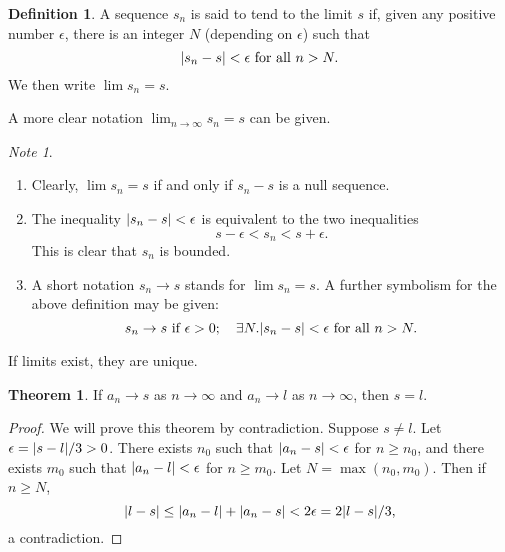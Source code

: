 \documentclass[12pt]{book}
\newcommand{\ra}{\rightarrow}
\theoremstyle{definition}
\newtheorem{definition}{Definition}[section]
\newtheorem{theorem}{Theorem}[chapter]
\theoremstyle{remark}
\newtheorem*{note}{Note}
\DeclarePairedDelimiter\abs{\lvert}{\rvert}
\begin{document}
				\begin{definition}
					A sequence $s_n$ is said to tend to the limit $s$ if, given any positive number $\epsilon$, there is an integer $N$ (depending on $\epsilon$) such that
						\begin{equation*}
							\abs*{s_n - s} < \epsilon \text{ for all } n > N.
						\end{equation*}
						We then write $\lim s_n = s$.
				\end{definition}
			  A more clear notation $\lim_{n \ra \infty} s_n = s$ can be given.
			\begin{note}
				\begin{enumerate}
					\item Clearly, $\lim s_n = s$ if and only if $s_n - s$ is a null sequence.
					
					\item The inequality $\abs*{s_n - s} < \epsilon$ is equivalent to the two inequalities
					\begin{equation*}
					s - \epsilon < s_n < s + \epsilon.
					\end{equation*}
					This is clear that $s_n$ is bounded.
					
					\item A short notation $s_n \ra s$ stands for $\lim s_n = s$. A further symbolism for the above definition may be given:
					\begin{equation*}
					s_n \ra s \text{ if } \epsilon >0;\quad \exists N.\abs*{s_n - s} < \epsilon \text{ for all } n > N.
					\end{equation*}
				\end{enumerate}
			\end{note}
		    If limits exist, they are unique.
		    \begin{theorem}
		    	If $a_n \ra s$ as $n \ra \infty$ and $a_n \ra l$ as $n \ra \infty$, then $s = l$.
		    \end{theorem}
	    	\begin{proof}
	    		We will prove this theorem by contradiction. Suppose $s \neq l$. Let $\epsilon = \abs{s - l}/3 > 0$. There exists $n_0$ such that $\abs{a_n - s} < \epsilon$ for $n \geq n_0$, and there exists $m_0$ such that $\abs{a_n - l} < \epsilon$ for $n \geq m_0$. Let $N = \max(n_0 , m_0)$. Then if $n \geq N$,
	    		\begin{equation*}
	    			\abs{l - s} \leq \abs{a_n - l} + \abs{a_n - s} < 2\epsilon = 2\abs{l - s}/3,
	    		\end{equation*}
	    		a contradiction.
	    	\end{proof}
\end{document}
